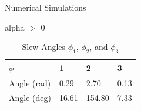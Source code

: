 \documentclass{beamer}
\begin{document}
\begin{frame}{Numerical Simulations}
\begin{block}{alpha $>$ 0}
	
	\begin{table}[H]
		\centering
		\caption{Slew Angles $\phi_1$, $\phi_2$, and $\phi_3$}
		\begin{tabular}{llll}
			\toprule
			\midrule
			$\phi$ & 1 & 2 & 3 \\
			\midrule
			Angle (rad) & 0.29 & 2.70 & 0.13 \\
			Angle (deg) & 16.61 & 154.80 & 7.33 \\ 
			\midrule
			\bottomrule
		\end{tabular}%
		\label{tab:FOG_SF}%
	\end{table}%
	
\end{block}
\end{frame}
\end{document}
